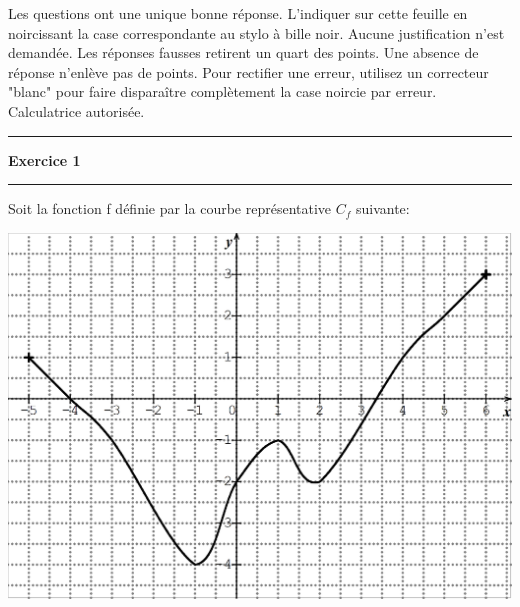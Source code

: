 \documentclass[a4paper]{article}
\newif\ifpythontex
\newcommand{\includegraphicx}[2][]{%
\ifpythontex
\texttt{[image: \#2]}
\fi
}
\begin{document}
{{\begin{minipage}{0.96\linewidth}
\vspace*{3mm} %
\begin{center}\em  %

Les questions ont une unique bonne réponse. L'indiquer sur cette feuille en noircissant la case correspondante au stylo à bille noir. Aucune justification n'est demandée.
Les réponses fausses retirent un quart des points. Une absence de réponse n'enlève pas de points.
Pour rectifier une erreur, utilisez un correcteur "blanc" pour faire disparaître complètement la case noircie par erreur.	Calculatrice autorisée.
 

\end{center}

	\end{minipage}\hspace*{\fill}
	
	
\vspace{1ex}







\begin{center}
\hrule\vspace{2mm}
\bf\Large Exercice 1
\vspace{2mm}\hrule
\end{center}

Soit la fonction f définie par la courbe représentative $C_{f}$ suivante:
\begin{center}
\includegraphics[scale=1]{data/graph1.png}
\end{center}

}}
\end{document}
